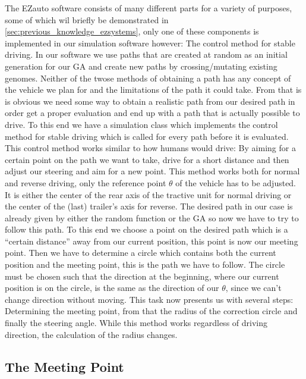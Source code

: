 The EZauto software consists of many different parts for a variety of purposes, some of which wil briefly be demonstrated in \ref{sec:previous_knowledge_ezsystems}, only one of these components is implemented in our simulation software however: The control method for stable driving. \cite{12}
In our software we use paths that are created at random as an initial generation for our GA and create new paths by crossing/mutating existing genomes. Neither of the twose methods of obtaining a path has any concept of the vehicle we plan for and the limitations of the path it could take. From that is is obvious we need some way to obtain a realistic path from our desired path in order get a proper evaluation and end up with a path that is actually possible to drive. To this end we have a simulation class which implements the control method for stable driving which is called for every path before it is evaluated. This control method works similar to how humans would drive: By aiming for a certain point on the path we want to take, drive for a short distance and then adjust our steering and aim for a new point. \cite{31,32} This method works both for normal and reverse driving, only the reference point $\theta$ of the vehicle has to be adjusted. It is either the center of the rear axis of the tractive unit for normal driving or the center of the (last) trailer's axis for reverse. 
The desired path in our case is already given by either the random function or the GA so now we have to try to follow this path. To this end we choose a point on the desired path which is a "`certain distance"' away from our current position, this point is now our meeting point. Then we have to determine a circle which contains both the current position and the meeting point, this is the path we have to follow. The circle must be chosen such that the direction at the beginning, where our current position is on the circle, is the same as the direction of our $\theta$, since we can't change direction without moving.
This task now presents us with several steps: Determining the meeting point, from that the radius of the correction circle and finally the steering angle. While this method works regardless of driving direction, the calculation of the radius changes.

\subsection{The Meeting Point}
\label{sec:meeting_point}

